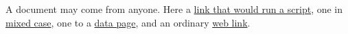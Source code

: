 A document may come from anyone. Here a \href{javascript:window.__ran='link'}{link that would run
a script}, one in \href{JaVaScRiPt:window.__ran='mixed'}{mixed case}, one to a
\href{data:text/html,<b>page</b>}{data page}, and an ordinary
\href{https://example.org/}{web link}.
